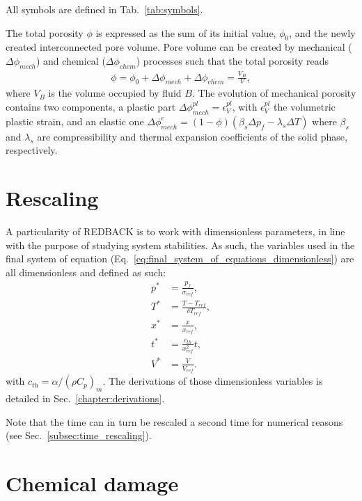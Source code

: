\documentclass[]{scrreprt}
\newcommand{\redback}{{REDBACK}}
\begin{document}
All symbols are defined in Tab.~\ref{tab:symbols}.

The total porosity $\phi$ is expressed as the sum of its initial value, $\phi_0$,
and the newly created interconnected pore volume. Pore volume can be created
by mechanical ($\Delta\phi_{mech}$) and chemical ($\Delta \phi_{chem}$)
processes such that the total porosity reads
\begin{eqnarray}
    \label{eq:porosity}
    \phi = \phi_0 + \Delta\phi_{mech} + \Delta\phi_{chem} = \frac{V_{B}}{V},
\end{eqnarray}
where $V_B$ is the volume occupied by fluid $B$.  The evolution of mechanical
porosity contains two components, a plastic part $\Delta
\phi^{pl}_{mech}=\epsilon^{pl}_V$, with $\epsilon^{pl}_V$ the volumetric plastic strain, and an
elastic one $\Delta \phi^{e}_{mech}=(1-\phi)\left( \beta_s \Delta p_f -
\lambda_s \Delta T \right)$
where $\beta_s$ and $\lambda_s$ are compressibility and
thermal expansion coefficients of the solid phase, respectively.

\section{Rescaling}
\label{sec:rescaling}
A particularity of \redback{} is to work with dimensionless parameters, in line with the purpose of studying system stabilities. As such, the variables used in the final system of equation (Eq.~\ref{eq:final_system_of_equations_dimensionless}) are all dimensionless and defined as such:
\begin{subequations}
  \label{eq:dimensionless_defs}
  \begin{align}
  p^* &= \frac{p_f}{\sigma_{ref}}, \\   
  T^* &= \frac{T-T_{ref}}{\delta T_{ref}}, \\   
  x^* &= \frac{x}{x_{ref}}, \\   
  t^* &= \frac{c_{th}}{x^2_{ref}}t, \\   
  V^* &= \frac{V}{V_{ref}}.
  \end{align}
\end{subequations}
with $c_{th} = \alpha / (\rho C_p)_m$. The derivations of those dimensionless variables is detailed in Sec.~\ref{chapter:derivations}.

Note that the time can in turn be rescaled a second time for numerical reasons (see Sec.~\ref{subsec:time_rescaling}).


\section{Chemical damage}
\label{sec:chem_damage}
\end{document}
